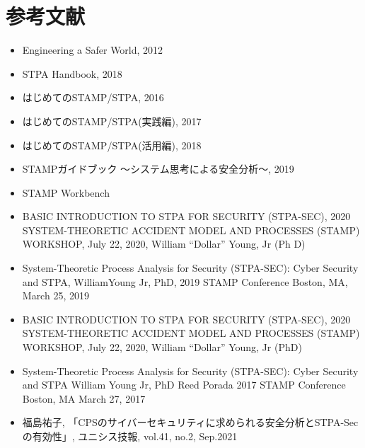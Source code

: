 \section{参考文献}
\begin{itemize}
    \item Engineering a Safer World, 2012
    \item STPA Handbook, 2018
    \item はじめてのSTAMP/STPA, 2016
    \item はじめてのSTAMP/STPA(実践編), 2017
    \item はじめてのSTAMP/STPA(活用編), 2018
    \item STAMPガイドブック ～システム思考による安全分析～, 2019
    \item STAMP Workbench
    \item BASIC INTRODUCTION TO STPA FOR SECURITY (STPA-SEC), 2020 SYSTEM-THEORETIC ACCIDENT MODEL AND PROCESSES (STAMP) WORKSHOP, July 22, 2020, William “Dollar” Young, Jr (Ph D)
    \item System-Theoretic Process Analysis for Security (STPA-SEC): Cyber Security and STPA, WilliamYoung Jr, PhD, 2019 STAMP Conference Boston, MA, March 25, 2019
    \item BASIC INTRODUCTION TO STPA FOR SECURITY (STPA-SEC), 2020 SYSTEM-THEORETIC ACCIDENT MODEL AND PROCESSES (STAMP) WORKSHOP, July 22, 2020, William “Dollar” Young, Jr (PhD) 
    \item System-Theoretic Process Analysis for Security (STPA-SEC): Cyber Security and STPA William Young Jr, PhD Reed Porada 2017 STAMP Conference Boston, MA March 27, 2017
    \item 福島祐子, 「CPSのサイバーセキュリティに求められる安全分析とSTPA-Secの有効性」, ユニシス技報, vol.41,  no.2, Sep.2021
\end{itemize}